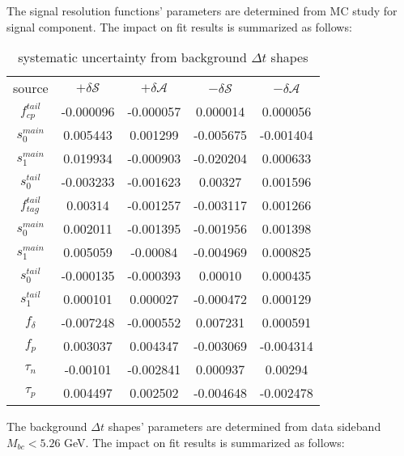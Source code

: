 The signal resolution functions' parameters are determined from MC study for signal component. The impact on fit results is summarized as follows: 
\begin{table}[H]
	\begin{minipage}[b]{1.0\linewidth}
		\centering
		\caption{systematic uncertainty from background $\Delta t$ shapes}
		\begin{tabular}{c c c c c}
			\hline
			source & $+\delta \mathcal{S}$ & $+\delta \mathcal{A}$ & $-\delta \mathcal{S}$ &  $-\delta \mathcal{A}$\\
			$f_{cp}^{tail}$ & -0.000096 & -0.000057
& 0.000014
& 0.000056
\\
			$s_0^{main}$& 0.005443
& 0.001299
& -0.005675
& -0.001404
\\
			$s_1^{main}$ & 0.019934
& -0.000903
& -0.020204
& 0.000633
\\
			$s_0^{tail}$ &  -0.003233
& -0.001623
& 0.00327
& 0.001596
\\
			$f_{tag}^{tail}$ & 0.00314
& -0.001257
& -0.003117
& 0.001266
\\
			$s_0^{main}$&  0.002011
& -0.001395
& -0.001956
& 0.001398
\\
			$s_1^{main}$ & 0.005059
& -0.00084
& -0.004969
& 0.000825
\\
			$s_0^{tail}$ &  -0.000135
& -0.000393
& 0.00010 & 0.000435
\\
			$s_1^{tail}$  & 0.000101 & 0.000027 &  -0.000472
& 0.000129
\\
			$f_{\delta}$ & -0.007248
& -0.000552
& 0.007231
& 0.000591
\\
			$f_p$ &  0.003037
& 0.004347
& -0.003069
& -0.004314
\\
			$\tau_n$ & -0.00101 & -0.002841
& 0.000937
& 0.00294
\\
			$\tau_p$ &  0.004497
& 0.002502
& -0.004648
& -0.002478
			\\
			\hline
		\end{tabular}
	\end{minipage}
\end{table}
The background $\Delta t$ shapes' parameters are determined from data sideband $M_{bc}<5.26$ GeV. The impact on fit results is summarized as follows: 
